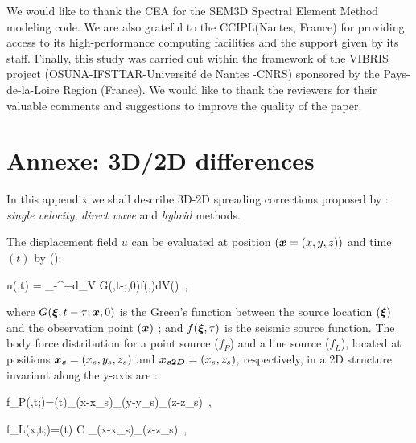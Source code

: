 \documentclass[extra,mreferee]{gji}
\begin{document}
\begin{acknowledgments}
We would like to thank the CEA for the SEM3D Spectral Element Method modeling code. We are also grateful to the CCIPL(Nantes, France) for providing access to its high-performance computing facilities and the support given  by its staff. Finally, this study was carried out within the framework of the VIBRIS project (OSUNA-IFSTTAR-Universit\'e de Nantes -CNRS) sponsored by the Pays-de-la-Loire Region (France). 
We would like to thank the reviewers for their valuable comments and suggestions to improve the quality of the paper.
\end{acknowledgments}

\clearpage
\newpage




\clearpage
\newpage

\section*{Annexe: 3D/2D differences}

In this appendix we shall describe 3D-2D spreading corrections proposed by \cite{Forbriger_LSS_2014}: \textit{single velocity}, \textit{direct wave} and \textit{hybrid} methods.

The displacement field $u$ can be evaluated at position $(\mitbf{x}=(x,y,z))$ and time $(t)$ by (\cite{aki2002quantitative}):

\equation
u(,t) = \int_{-\infty}^{+\infty}d\tau \int \int \int_{V} G(\mitbf{\xi},t-\tau;,0)f(\mitbf{\xi},\tau)dV(\mitbf{\xi})\ ,
\label{eq:displacement}
\endequation

where $G(\mitbf{\xi},t-\tau;\mitbf{x},0)$ is the Green's function between the source location $(\mitbf{\xi})$ and the observation point $(\mitbf{x})$ ; and $f(\mitbf{\xi},\tau)$ is the seismic source function. The body force distribution for a point source ($f_{P}$) and a line source ($f_{L}$), located at positions $ \mitbf{x_{s}}=(x_{s}, y_{s},z_{s}) $ and $ \mitbf{x_{s2D}}=(x_{s},z_{s}) $, respectively, in a 2D structure invariant along the y-axis are :

\equation
f_{P}(,t;)=(t)\delta_{}(x-x_{s})\delta_{}(y-y_{s})\delta_{}(z-z_{s})\ , \label{eq:point-force}
\endequation

\equation
f_{L}(x,t;)=(t) C \delta_{}(x-x_{s})\delta_{}(z-z_{s})\ , 
\label{eq:line-force}
\endequation
\end{document}
